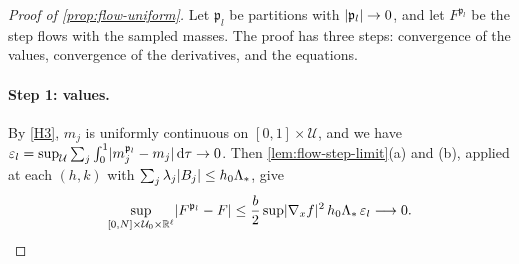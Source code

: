 \begin{proof}[Proof of \cref{prop:flow-uniform}]
Let $\mathfrak p_l$ be partitions with $\lvert \mathfrak p_l\rvert\to0$, and let $F^{\mathfrak p_l}$
be the step flows with the sampled masses. The proof has three steps: convergence
of the values, convergence of the derivatives, and the equations.

\paragraph{Step 1: values.} By \ref{H3}, $m_j$ is uniformly continuous on
$[0,1]\times\mathcal U$, and we have
$\varepsilon_l=\sup_{\mathcal U}\sum_j\int_0^1\lvert m_j^{\mathfrak p_l}-m_j\rvert\,\mathrm d\tau\to0$.
Then \cref{lem:flow-step-limit}(a) and (b), applied at each $(h,k)$ with
$\sum_j\lambda_j\lvert B_j\rvert\le h_0\Lambda_*$, give
\[
 \sup_{[0,N]\times\mathcal U_0\times\mathbb R^\ell}\lvert F^{\mathfrak p_l}-F\rvert
 \le\frac b2\sup\lvert \nabla_xf\rvert^2\,h_0\Lambda_*\,\varepsilon_l\longrightarrow0.
\]


\end{proof}
